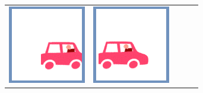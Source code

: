 \documentclass[12pt, a4paper]{article}
\begin{document}
\begin{minipage}{\textwidth}
\begin{table}[H]
\begin{tabulary}{\linewidth}{|C|CCCC|}
				\vspace{0.01cm}\includegraphics[width=\linewidth]{option4} &
				\vspace{0.01cm}\includegraphics[width=\linewidth]{option2} &

\end{tabulary}
\end{table}
\end{minipage}
\end{document}
